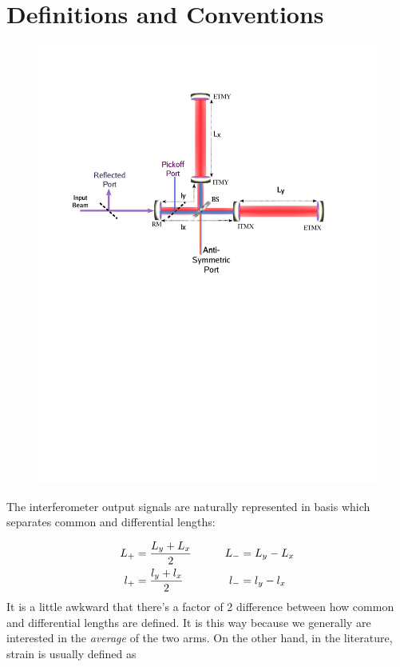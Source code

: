 %
\chapter{Definitions and Conventions}
\label{app:variables}

\begin{figure}[!h]
\centerline{\includegraphics[angle=0,width=6.5in]{Figures/Chap3/IFO2.pdf}}
\end{figure}

The interferometer output signals are naturally represented in basis which
separates common and differential lengths:

\begin{alignat}{2} \label{eq:LengthDefinitions}
    L_{+} &= \frac{L_y + L_x}{2}      & \qquad     L_{-} &= L_y - L_x \\
    l_{+} &= \frac{l_y + l_x}{2}      & \qquad     l_{-} &= l_y - l_x
 \notag
\end{alignat}
It is a little awkward that there's a factor of 2 difference between how common
and differential lengths are defined. It is this way because we generally are
interested in the \emph{average} of the two arms. On the other hand, in the
literature, strain is usually defined as 

